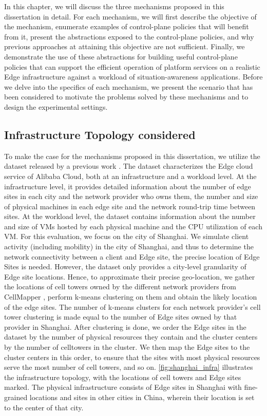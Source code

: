 \par In this chapter, we will discuss the three mechanisms proposed in this dissertation in detail. For each mechanism, we will first describe the objective of the mechanism, enumerate examples of control-plane policies that will benefit from it, present the abstractions exposed to the control-plane policies, and why previous approaches at attaining this objective are not sufficient. Finally, we demonstrate the use of these abstractions for building useful control-plane policies that can support the efficient operation of platform services on a realistic Edge infrastructure against a workload of situation-awareness applications. Before we delve into the specifics of each mechanism, we present the scenario that has been considered to motivate the problems solved by these mechanisms and to design the experimental settings. 

\subsection{Infrastructure Topology considered}
\label{sec:nep_infra_topology}
\par To make the case for the mechanisms proposed in this dissertation, we utilize the dataset released by a previous work \cite{xu2021cloud}. The dataset characterizes the Edge cloud service of Alibaba Cloud, both at an infrastructure and a workload level. At the infrastructure level, it provides detailed information about the number of edge sites in each city and the network provider who owns them, the number and size of physical machines in each edge site and the network round-trip time between sites. At the workload level, the dataset contains information about the number and size of VMs hosted by each physical machine and the CPU utilization of each VM. For this evaluation, we focus on the city of Shanghai. We simulate client activity (including mobility) in the city of Shanghai, and thus to determine the network connectivity between a client and Edge site, the precise location of Edge Sites is needed. However, the dataset only provides a city-level granularity of Edge site locations. Hence, to approximate their precise geo-location, we gather the locations of cell towers owned by the different network providers from CellMapper \cite{cellmapper}, perform k-means clustering on them and obtain the likely location of the edge sites. The number of k-means clusters for each network provider's cell tower clustering is made equal to the number of Edge sites owned by that provider in Shanghai. After clustering is done, we order the Edge sites in the dataset by the number of physical resources they contain and the cluster centers by the number of celltowers in the cluster. We then map the Edge sites to the cluster centers in this order, to ensure that the sites with most physical resources serve the most number of cell towers, and so on. \cref{fig:shanghai_infra} illustrates the infrastructure topology, with the locations of cell towers and Edge sites marked. The physical infrastructure consists of Edge sites in Shanghai with fine-grained locations and sites in other cities in China, wherein their location is set to the center of that city. 

